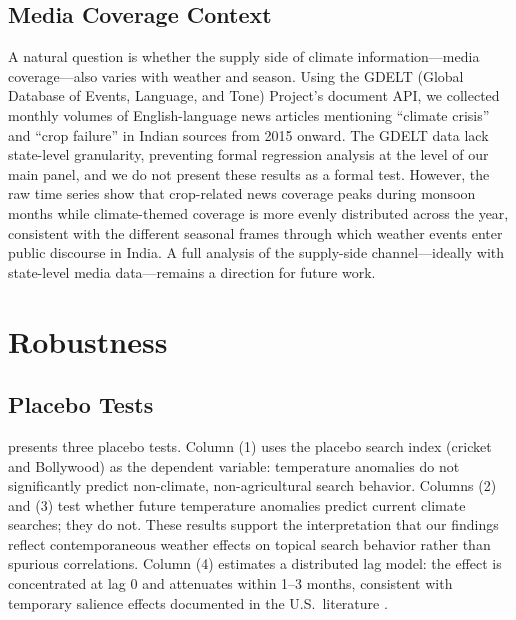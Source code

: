 \documentclass[12pt]{article}
\begin{document}
\subsection{Media Coverage Context}

A natural question is whether the supply side of climate information---media coverage---also varies with weather and season. Using the GDELT (Global Database of Events, Language, and Tone) Project's document API, we collected monthly volumes of English-language news articles mentioning ``climate crisis'' and ``crop failure'' in Indian sources from 2015 onward. The GDELT data lack state-level granularity, preventing formal regression analysis at the level of our main panel, and we do not present these results as a formal test. However, the raw time series show that crop-related news coverage peaks during monsoon months while climate-themed coverage is more evenly distributed across the year, consistent with the different seasonal frames through which weather events enter public discourse in India. A full analysis of the supply-side channel---ideally with state-level media data---remains a direction for future work.

\section{Robustness}
\label{sec:robustness}

\subsection{Placebo Tests}

 presents three placebo tests. Column (1) uses the placebo search index (cricket and Bollywood) as the dependent variable: temperature anomalies do not significantly predict non-climate, non-agricultural search behavior. Columns (2) and (3) test whether future temperature anomalies predict current climate searches; they do not. These results support the interpretation that our findings reflect contemporaneous weather effects on topical search behavior rather than spurious correlations. Column (4) estimates a distributed lag model: the effect is concentrated at lag 0 and attenuates within 1--3 months, consistent with temporary salience effects documented in the U.S.\ literature \citep{deryugina2013}.
\end{document}
